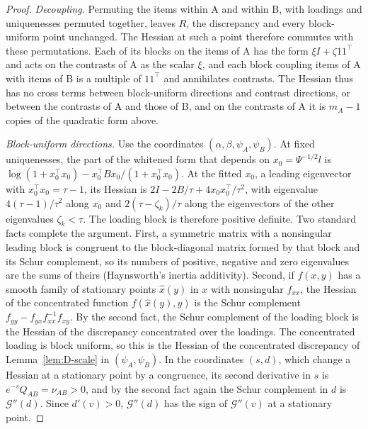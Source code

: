 \begin{proof}
\textit{Decoupling.} Permuting the items within A and within B, with loadings and uniquenesses permuted together, leaves $R$, the discrepancy and every block-uniform point unchanged. The Hessian at such a point therefore commutes with these permutations. Each of its blocks on the items of A has the form $\xi I+\zeta11^{\top}$ and acts on the contrasts of A as the scalar $\xi$, and each block coupling items of A with items of B is a multiple of $11^{\top}$ and annihilates contrasts. The Hessian thus has no cross terms between block-uniform directions and contrast directions, or between the contrasts of A and those of B, and on the contrasts of A it is $m_A-1$ copies of the quadratic form above.

\textit{Block-uniform directions.} Use the coordinates $(\alpha,\beta,\psi_A,\psi_B)$. At fixed uniquenesses, the part of the whitened form that depends on $x_0=\Psi^{-1/2}l$ is $\log(1+x_0^{\top}x_0)-x_0^{\top}Bx_0/(1+x_0^{\top}x_0)$. At the fitted $x_0$, a leading eigenvector with $x_0^{\top}x_0=\tau-1$, its Hessian is $2I-2B/\tau+4x_0x_0^{\top}/\tau^2$, with eigenvalue $4(\tau-1)/\tau^2$ along $x_0$ and $2(\tau-\zeta_k)/\tau$ along the eigenvectors of the other eigenvalues $\zeta_k<\tau$. The loading block is therefore positive definite. Two standard facts complete the argument. First, a symmetric matrix with a nonsingular leading block is congruent to the block-diagonal matrix formed by that block and its Schur complement, so its numbers of positive, negative and zero eigenvalues are the sums of theirs (Haynsworth's inertia additivity). Second, if $f(x,y)$ has a smooth family of stationary points $\hat x(y)$ in $x$ with nonsingular $f_{xx}$, the Hessian of the concentrated function $f(\hat x(y),y)$ is the Schur complement $f_{yy}-f_{yx}f_{xx}^{-1}f_{xy}$. By the second fact, the Schur complement of the loading block is the Hessian of the discrepancy concentrated over the loadings. The concentrated loading is block uniform, so this is the Hessian of the concentrated discrepancy of Lemma~\ref{lem:D-scale} in $(\psi_A,\psi_B)$. In the coordinates $(s,d)$, which change a Hessian at a stationary point by a congruence, its second derivative in $s$ is $e^{-s}Q_{AB}=\nu_{AB}>0$, and by the second fact again the Schur complement in $d$ is $\mathcal G''(d)$. Since $d'(v)>0$, $\mathcal G''(d)$ has the sign of $\mathcal G''(v)$ at a stationary point.
\end{proof}

